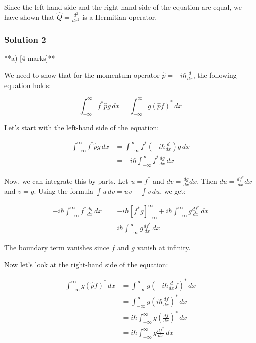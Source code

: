 \documentclass{article}
\begin{document}
Since the left-hand side and the right-hand side of the equation are equal, we have shown that $\hat{Q} = \frac{d^2}{dx^2}$ is a Hermitian operator.


\subsubsection{Solution 2}
**a) [4 marks]**

We need to show that for the momentum operator $\hat{p} = -i\hbar \frac{d}{dx}$, the following equation holds:

\begin{equation*}
\int_{-\infty}^{\infty} f^* \hat{p} g \, dx = \int_{-\infty}^{\infty} g (\hat{p} f)^* \, dx
\end{equation*}

Let's start with the left-hand side of the equation:

\begin{align*}
\int_{-\infty}^{\infty} f^* \hat{p} g \, dx &= \int_{-\infty}^{\infty} f^* \left( -i\hbar \frac{d}{dx} \right) g \, dx \\
&= -i\hbar \int_{-\infty}^{\infty} f^* \frac{dg}{dx} \, dx
\end{align*}

Now, we can integrate this by parts.  Let $u = f^*$ and $dv = \frac{dg}{dx} dx$. Then $du = \frac{df^*}{dx} dx$ and $v = g$. Using the formula $\int u \, dv = uv - \int v \, du$, we get:

\begin{align*}
-i\hbar \int_{-\infty}^{\infty} f^* \frac{dg}{dx} \, dx &= -i\hbar \left[ f^* g \right]_{-\infty}^{\infty} + i\hbar \int_{-\infty}^{\infty} g \frac{df^*}{dx} \, dx \\
&= i\hbar \int_{-\infty}^{\infty} g \frac{df^*}{dx} \, dx
\end{align*}

The boundary term vanishes since $f$ and $g$ vanish at infinity.

Now let's look at the right-hand side of the equation:

\begin{align*}
\int_{-\infty}^{\infty} g (\hat{p} f)^* \, dx &= \int_{-\infty}^{\infty} g \left( -i\hbar \frac{d}{dx} f \right)^* \, dx \\
&= \int_{-\infty}^{\infty} g \left( i\hbar \frac{df}{dx} \right)^* \, dx \\
&= i\hbar \int_{-\infty}^{\infty} g \left( \frac{df}{dx} \right)^* \, dx \\
&= i\hbar \int_{-\infty}^{\infty} g \frac{df^*}{dx} \, dx
\end{align*}
\end{document}
